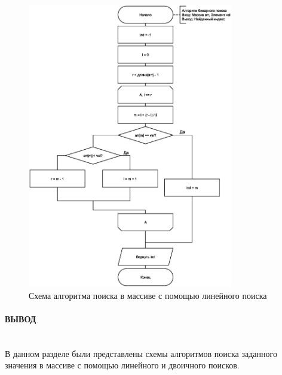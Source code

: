 \begin{figure}[h]
    \centering
    \includegraphics[width=0.8\textwidth]{images/schemes/bin_search.eps}
    \caption{Схема алгоритма поиска в массиве с помощью линейного поиска}
    \label{fig:scheme-2}
\end{figure}

\clearpage

\paragraph*{ВЫВОД} ${}$ \\

В данном разделе были представлены схемы алгоритмов поиска заданного значения в массиве с помощью линейного и двоичного поисков.

\clearpage